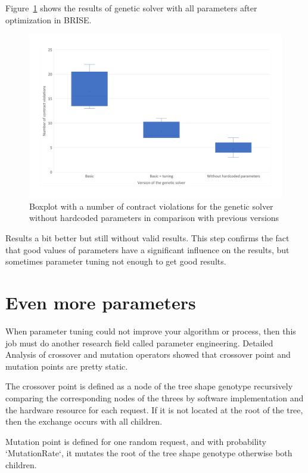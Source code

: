 Figure~\ref{fig:boxplotsolverNoHardcodedTuning} shows the results of genetic solver with all parameters after optimization in BRISE.
\begin{figure}
	\centering
	\includegraphics[width=\textwidth]{images/BoxPlotSolverNoHardcodedTuning.pdf}
	\caption[Boxplot with a number of contract violations for the genetic solver without hardcoded parameters in comparison with previous versions]{Boxplot with a number of contract violations for the genetic solver without hardcoded parameters in comparison with previous versions}
	\label{fig:boxplotsolverNoHardcodedTuning}
\end{figure}
Results a bit better but still without valid results.
This step confirms the fact that good values of parameters have a significant influence on the results, but sometimes parameter tuning not enough to get good results. 

\section{Even more parameters}
When parameter tuning could not improve your algorithm or process, then this job must do another research field called parameter engineering.
Detailed Analysis of crossover and mutation operators showed that crossover point and mutation points are pretty static.

The crossover point is defined as a node of the tree shape genotype recursively comparing the corresponding nodes of the threes by software implementation and the hardware resource for each request.
If it is not located at the root of the tree, then the exchange occurs with all children.

Mutation point is defined for one random request, and with probability `MutationRate`, it mutates the root of the tree shape genotype otherwise both children.

